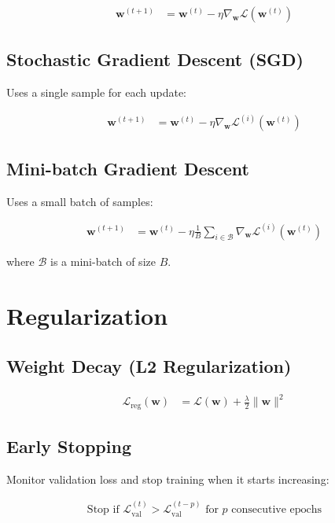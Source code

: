 \documentclass{article}
\begin{document}
\begin{align}
\boldsymbol{w}^{(t+1)} &= \boldsymbol{w}^{(t)} - \eta \nabla_{\boldsymbol{w}} \mathcal{L}(\boldsymbol{w}^{(t)})
\end{align}

\subsection{Stochastic Gradient Descent (SGD)}
Uses a single sample for each update:

\begin{align}
\boldsymbol{w}^{(t+1)} &= \boldsymbol{w}^{(t)} - \eta \nabla_{\boldsymbol{w}} \mathcal{L}^{(i)}(\boldsymbol{w}^{(t)})
\end{align}

\subsection{Mini-batch Gradient Descent}
Uses a small batch of samples:

\begin{align}
\boldsymbol{w}^{(t+1)} &= \boldsymbol{w}^{(t)} - \eta \frac{1}{B} \sum_{i \in \mathcal{B}} \nabla_{\boldsymbol{w}} \mathcal{L}^{(i)}(\boldsymbol{w}^{(t)})
\end{align}

where $\mathcal{B}$ is a mini-batch of size $B$.

\section{Regularization}

\subsection{Weight Decay (L2 Regularization)}

\begin{align}
\mathcal{L}_{\text{reg}}(\boldsymbol{w}) &= \mathcal{L}(\boldsymbol{w}) + \frac{\lambda}{2} \|\boldsymbol{w}\|^2
\end{align}

\subsection{Early Stopping}

Monitor validation loss and stop training when it starts increasing:

\begin{align}
\text{Stop if } \mathcal{L}_{\text{val}}^{(t)} > \mathcal{L}_{\text{val}}^{(t-p)} \text{ for } p \text{ consecutive epochs}
\end{align}
\end{document}
